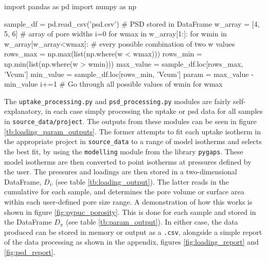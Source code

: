 \begin{table}[b!]
\begin{python}
import pandas as pd
import numpy as np

sample_df = pd.read_csv('psd.csv')  # PSD stored in DataFrame 
w_array = [4, 5, 6]  # array of pore widths  
i=0
for wmax in w_array[1:]:  
    for wmin in w_array[w_array<wmax]:  # every possible combination of two w values
        rows_max = np.max(list(np.where(w < wmax)))
        rows_min = np.min(list(np.where(w > wmin)))
        max_value = sample_df.loc[rows_max, 'Vcum']
        min_value = sample_df.loc[rows_min, 'Vcum']
        param = max_value - min_value
        i+=1 # Go through all possible values of wmin for wmax
\end{python}
\label{fig:pypuc_porosity}
\end{table}

The \verb|uptake_processing.py| and \verb|psd_processing.py| modules are fairly self-explanatory, in each case simply processing the uptake or \acrshort{psd} data for all samples in \verb|source_data/project|. The outputs from these modules can be seen in figure \ref{tb:loading_param_outputs}. The former attempts to fit each uptake isotherm in the appropriate project in \verb|source_data| to a range of model isotherms and selects the best fit, by using the \verb|modelling| module from the library \verb|pygaps|.\citep{Iacomi2019pyGAPS} These model isotherms are then converted to point isotherms at pressures defined by the user. The pressures and loadings are then stored in a two-dimensional DataFrame, $D_\upsilon$ (see table \ref{tb:loading_output}). The latter reads in the cumulative  for each sample, and determines the pore volume or surface area within each user-defined pore size range. A demonstration of how this works is shown in figure \ref{fig:pypuc_porosity}. This is done for each sample and stored in the DataFrame $D_\pi$ (see table \ref{tb:param_output}). In either case, the data produced can be stored in memory or output as a \verb|.csv|, alongside a simple report of the data processing as shown in the appendix, figures \ref{fig:loading_report} and \ref{fig:psd_report}.


